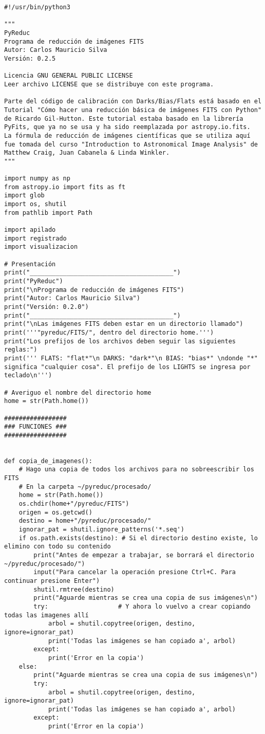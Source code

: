 \begin{lstlisting}[style=python]
#!/usr/bin/python3

"""
PyReduc
Programa de reducción de imágenes FITS
Autor: Carlos Mauricio Silva
Versión: 0.2.5

Licencia GNU GENERAL PUBLIC LICENSE
Leer archivo LICENSE que se distribuye con este programa.

Parte del código de calibración con Darks/Bias/Flats está basado en el Tutorial "Cómo hacer una reducción básica de imágenes FITS con Python" de Ricardo Gil-Hutton. Este tutorial estaba basado en la librería PyFits, que ya no se usa y ha sido reemplazada por astropy.io.fits.
La fórmula de reducción de imágenes científicas que se utiliza aquí fue tomada del curso "Introduction to Astronomical Image Analysis" de  Matthew Craig, Juan Cabanela & Linda Winkler.
"""

import numpy as np
from astropy.io import fits as ft
import glob
import os, shutil
from pathlib import Path

import apilado
import registrado
import visualizacion

# Presentación
print("_______________________________________")
print("PyReduc")
print("\nPrograma de reducción de imágenes FITS")
print("Autor: Carlos Mauricio Silva")
print("Versión: 0.2.0")
print("_______________________________________")
print("\nLas imágenes FITS deben estar en un directorio llamado")
print('''"pyreduc/FITS/", dentro del directorio home.''')
print("Los prefijos de los archivos deben seguir las siguientes reglas:")
print(''' FLATS: "flat*"\n DARKS: "dark*"\n BIAS: "bias*" \ndonde "*" significa "cualquier cosa". El prefijo de los LIGHTS se ingresa por teclado\n''')

# Averiguo el nombre del directorio home
home = str(Path.home())

#################
### FUNCIONES ###
#################


def copia_de_imagenes():
    # Hago una copia de todos los archivos para no sobreescribir los FITS
    # En la carpeta ~/pyreduc/procesado/
    home = str(Path.home())
    os.chdir(home+"/pyreduc/FITS")
    origen = os.getcwd()
    destino = home+"/pyreduc/procesado/"
    ignorar_pat = shutil.ignore_patterns('*.seq')
    if os.path.exists(destino): # Si el directorio destino existe, lo elimino con todo su contenido
        print("Antes de empezar a trabajar, se borrará el directorio ~/pyreduc/procesado/")
        input("Para cancelar la operación presione Ctrl+C. Para continuar presione Enter")
        shutil.rmtree(destino)
        print("Aguarde mientras se crea una copia de sus imágenes\n") 
        try:                   # Y ahora lo vuelvo a crear copiando todas las imagenes allí     
            arbol = shutil.copytree(origen, destino, ignore=ignorar_pat) 
            print('Todas las imágenes se han copiado a', arbol)
        except:
            print('Error en la copia')
    else:
        print("Aguarde mientras se crea una copia de sus imágenes\n") 
        try:                        
            arbol = shutil.copytree(origen, destino, ignore=ignorar_pat) 
            print('Todas las imágenes se han copiado a', arbol)
        except:
            print('Error en la copia')



\end{lstlisting}
